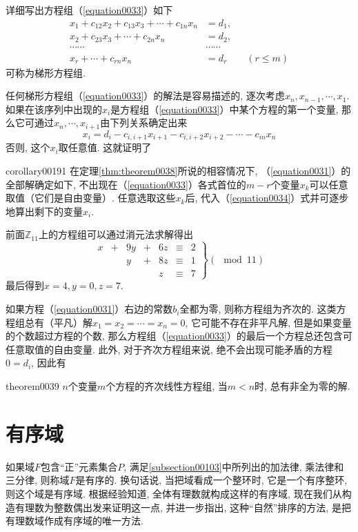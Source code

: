详细写出方程组（\ref{equation0033}）如下
\begin{equation}\label{equation0034}
\begin{aligned}
x_1+c_{12}x_2+c_{13}x_3+\cdots+c_{1n}x_n&=d_1,\\
x_2+c_{23}x_3+\cdots+c_{2n}x_n&=d_2,\\
\cdots\cdots&\cdots\cdots\\
x_r+\cdots+c_{rn}x_n&=d_r\qquad(r \le m)
\end{aligned}
\end{equation}
可称为梯形方程组. 

任何梯形方程组（\ref{equation0033}）的解法是容易描述的, 逐次考虑$x_{n}, x_{n-1}, \cdots, x_1$. 如果在该序列中出现的$x_i$是方程组（\ref{equation0033}）中某个方程的第一个变量, 那么它可通过$x_n,\cdots, x_{i+1}$由下列关系确定出来
\[
x_i = d_i - c_{i,i+1}x_{i+1}-c_{i,i+2}x_{i+2}-\cdots-c_{in}x_n
\]
否则, 这个$x_i$取任意值. 这就证明了
\begin{corollary}{}{corollary00191}
在定理\ref{thm:theorem0038}所说的相容情况下, （\ref{equation0031}）的全部解确定如下, 不出现在（\ref{equation0033}）各式首位的$m-r$个变量$x_k$可以任意取值（它们是自由变量）. 任意选取这些$x_k$后, 代入（\ref{equation0034}）式并可逐步地算出剩下的变量$x_i$. 
\end{corollary}

前面$\mathbb{Z}_11$上的方程组可以通过消元法求解得出
\[
\left.
\begin{array}{rcrcrcl}
x&+&9y&+&6z&\equiv&2\\
&&y&+&8z&\equiv&1\\
&&&&z&\equiv&7
\end{array}
\right\}(\mod{11})
\]
最后得到$x=4,y=0,z=7$. 


如果方程（\ref{equation0031}）右边的常数$b_i$全都为零, 则称方程组为齐次的. 这类方程组总有（平凡）解$x_1=x_2=\cdots=x_n=0$, 它可能不存在非平凡解, 但是如果变量的个数超过方程的个数, 那么方程组（\ref{equation0033}）的最后一个方程总还包含可任意取值的自由变量. 此外, 对于齐次方程组来说, 绝不会出现可能矛盾的方程$0=d_i$, 因此有
\begin{theorem}{}{theorem0039}
$n$个变量$m$个方程的齐次线性方程组, 当$m < n$时, 总有非全为零的解. 
\end{theorem}

\section{有序域}
如果域$F$包含“正”元素集合$P$, 满足\ref{subsection00103}中所列出的加法律, 乘法律和三分律, 则称域$F$是有序的. 换句话说, 当把域看成一个整环时, 它是一个有序整环, 则这个域是有序域. 根据经验知道, 全体有理数就构成这样的有序域, 现在我们从构造有理数为整数偶出发来证明这一点, 并进一步指出, 这种“自然”排序的方法, 是把有理数域作成有序域的唯一方法. 

